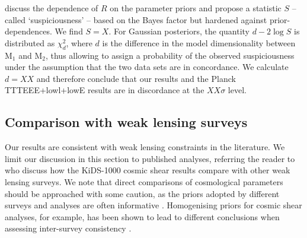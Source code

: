 \citet{Handley2019} discuss the dependence of $R$ on the parameter priors and propose a statistic $S$ -- called `suspiciousness' -- based on the Bayes factor but hardened against prior-dependences.  
We find $S=X$. 
For Gaussian posteriors, the quantity $d-2\log S$ is distributed as $\chi^2_{d}$, where $d$ is the difference in the model dimensionality between $\mathrm{M}_1$ and $\mathrm{M}_2$, thus allowing to assign a probability of the observed suspiciousness under the assumption that the two data sets are in concordance. 
 We calculate $d=XX$ and therefore conclude that our \tttp results and the Planck TTTEEE+lowl+lowE results are in discordance at the $XX\sigma$ level.


\subsection{Comparison with weak lensing surveys}
\label{sec:WL_comp}
Our results are consistent with weak lensing constraints in the literature.   We limit our discussion in this section to published \tttp analyses, referring the reader to \citet{asgari/etal:inprep} who discuss how the KiDS-1000 cosmic shear results compare with other weak lensing surveys.   We note that direct comparisons of cosmological parameters should be approached with some caution, as the priors adopted by different surveys and analyses are often informative \citep[see section 6.1 in][]{joachimi/etal:inprep}.   Homogenising priors for cosmic shear analyses, for example, has been shown to lead to different conclusions when assessing inter-survey consistency \citep{chang/etal:2019, joudaki/etal:2020, asgari/etal:2020_KD}.   

